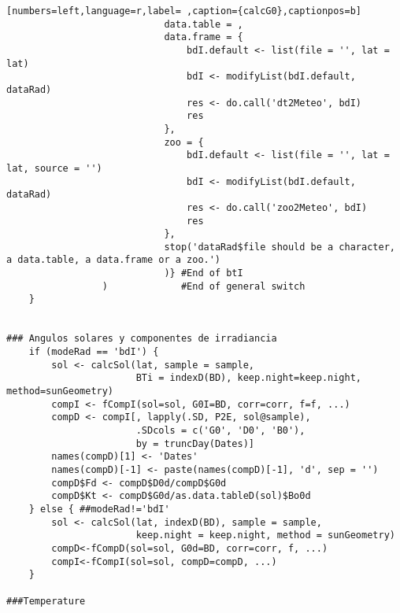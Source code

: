 \begin{lstlisting}[numbers=left,language=r,label= ,caption={calcG0},captionpos=b]
                            data.table = ,
                            data.frame = {
                                bdI.default <- list(file = '', lat = lat)
                                bdI <- modifyList(bdI.default, dataRad)
                                res <- do.call('dt2Meteo', bdI)
                                res
                            },
                            zoo = {
                                bdI.default <- list(file = '', lat = lat, source = '')
                                bdI <- modifyList(bdI.default, dataRad)
                                res <- do.call('zoo2Meteo', bdI)
                                res
                            },
                            stop('dataRad$file should be a character, a data.table, a data.frame or a zoo.')
                            )} #End of btI
                 )             #End of general switch    
    }


### Angulos solares y componentes de irradiancia
    if (modeRad == 'bdI') {
        sol <- calcSol(lat, sample = sample,
                       BTi = indexD(BD), keep.night=keep.night, method=sunGeometry)
        compI <- fCompI(sol=sol, G0I=BD, corr=corr, f=f, ...)
        compD <- compI[, lapply(.SD, P2E, sol@sample),
                       .SDcols = c('G0', 'D0', 'B0'),
                       by = truncDay(Dates)]
        names(compD)[1] <- 'Dates'
        names(compD)[-1] <- paste(names(compD)[-1], 'd', sep = '')
        compD$Fd <- compD$D0d/compD$G0d
        compD$Kt <- compD$G0d/as.data.tableD(sol)$Bo0d
    } else { ##modeRad!='bdI'
        sol <- calcSol(lat, indexD(BD), sample = sample,
                       keep.night = keep.night, method = sunGeometry)
        compD<-fCompD(sol=sol, G0d=BD, corr=corr, f, ...)
        compI<-fCompI(sol=sol, compD=compD, ...)
    }

###Temperature


\end{lstlisting}
